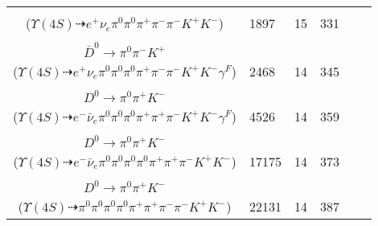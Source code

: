 \documentclass[landscape]{article}
\newcounter{rownumbers}
\newcommand\rn{\stepcounter{rownumbers}\arabic{rownumbers}}
\newcommand{\EOLP}{\\ \hline} %
\newcommand{\topoTags}[1]{#1} %
\begin{document}
\begin{longtable}{clcccc}
\rn & \makecell[l]{ $ 
\Upsilon(4S) \rightarrow B^{+} B^{-} ,
B^{+} \rightarrow e^{+} \nu_{e} \bar{D}^{0} ,
B^{-} \rightarrow \rho^{-} D^{0} ,
\bar{D}^{0} \rightarrow \pi^{0} \pi^{-} K^{+} ,
\rho^{-} \rightarrow \pi^{0} \pi^{-} ,
D^{0} \rightarrow \pi^{+} K^{-} 
$ \\ ($
\Upsilon(4S) \dashrightarrow e^{+} \nu_{e} \pi^{0} \pi^{0} \pi^{+} \pi^{-} \pi^{-} K^{+} K^{-} 
$) } & \topoTags{1897 & }15 & 331 \EOLP

\rn & \makecell[l]{ $ 
\Upsilon(4S) \rightarrow B^{+} B^{-} ,
B^{+} \rightarrow e^{+} \nu_{e} \bar{D}^{*0} \gamma^{F} ,
B^{-} \rightarrow \rho^{-} D^{0} ,
\bar{D}^{*0} \rightarrow \pi^{0} \bar{D}^{0} ,
\rho^{-} \rightarrow \pi^{0} \pi^{-} ,
D^{0} \rightarrow \pi^{+} K^{-} ,
$ \\ $
\bar{D}^{0} \rightarrow \pi^{0} \pi^{-} K^{+} 
$ \\ ($
\Upsilon(4S) \dashrightarrow e^{+} \nu_{e} \pi^{0} \pi^{0} \pi^{0} \pi^{+} \pi^{-} \pi^{-} K^{+} K^{-} \gamma^{F} 
$) } & \topoTags{2468 & }14 & 345 \EOLP

\rn & \makecell[l]{ $ 
\Upsilon(4S) \rightarrow B^{+} B^{-} ,
B^{+} \rightarrow \rho^{+} \bar{D}^{0} ,
B^{-} \rightarrow e^{-} \bar{\nu}_{e} D^{*0} \gamma^{F} ,
\rho^{+} \rightarrow \pi^{0} \pi^{+} ,
\bar{D}^{0} \rightarrow \pi^{-} K^{+} ,
D^{*0} \rightarrow \pi^{0} D^{0} ,
$ \\ $
D^{0} \rightarrow \pi^{0} \pi^{+} K^{-} 
$ \\ ($
\Upsilon(4S) \dashrightarrow e^{-} \bar{\nu}_{e} \pi^{0} \pi^{0} \pi^{0} \pi^{+} \pi^{+} \pi^{-} K^{+} K^{-} \gamma^{F} 
$) } & \topoTags{4526 & }14 & 359 \EOLP

\rn & \makecell[l]{ $ 
\Upsilon(4S) \rightarrow B^{+} B^{-} ,
B^{+} \rightarrow \rho^{+} \bar{D}^{0} ,
B^{-} \rightarrow e^{-} \bar{\nu}_{e} D^{*0} ,
\rho^{+} \rightarrow \pi^{0} \pi^{+} ,
\bar{D}^{0} \rightarrow \pi^{0} \pi^{-} K^{+} ,
D^{*0} \rightarrow \pi^{0} D^{0} ,
$ \\ $
D^{0} \rightarrow \pi^{0} \pi^{+} K^{-} 
$ \\ ($
\Upsilon(4S) \dashrightarrow e^{-} \bar{\nu}_{e} \pi^{0} \pi^{0} \pi^{0} \pi^{0} \pi^{+} \pi^{+} \pi^{-} K^{+} K^{-} 
$) } & \topoTags{17175 & }14 & 373 \EOLP

\rn & \makecell[l]{ $ 
\Upsilon(4S) \rightarrow B^{+} B^{-} ,
B^{+} \rightarrow \rho^{+} \bar{D}^{0} ,
B^{-} \rightarrow \rho^{-} D^{0} ,
\rho^{+} \rightarrow \pi^{0} \pi^{+} ,
\bar{D}^{0} \rightarrow \pi^{0} \pi^{-} K^{+} ,
\rho^{-} \rightarrow \pi^{0} \pi^{-} ,
$ \\ $
D^{0} \rightarrow \pi^{0} \pi^{+} K^{-} 
$ \\ ($
\Upsilon(4S) \dashrightarrow \pi^{0} \pi^{0} \pi^{0} \pi^{0} \pi^{+} \pi^{+} \pi^{-} \pi^{-} K^{+} K^{-} 
$) } & \topoTags{22131 & }14 & 387 \EOLP


\end{longtable}
\end{document}
